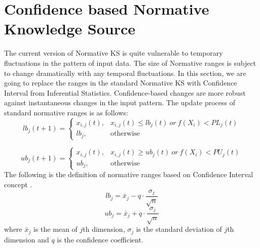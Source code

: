 \section{Confidence based Normative Knowledge Source}
The current version of Normative KS is quite vulnerable to temporary fluctuations in the pattern of input data. The size of Normative ranges is subject to change dramatically with any temporal fluctuations. In this section, we are going to replace the ranges in the standard Normative KS with Confidence Interval from Inferential Statistics. Confidence-based changes are more robust against instantaneous changes in the input pattern. The update process of standard normative ranges is as follows:
\begin{equation}
lb_{j}(t+1) = \begin{cases} x_{i,j}(t), & x_{i,j}(t)\leq lb_{j}(t)\:or\:f(X_{i})<PL_{j}(t)  \\ lb_{j}, & \mbox{otherwise} \end{cases}
\end{equation}

\begin{equation}
ub_{j}(t+1) = \begin{cases} x_{i,j}(t), & x_{i,j}(t)\ge ub_{j}(t)\:or\:f(X_{i})<PU_{j}(t)  \\ ub_{j}, & \mbox{otherwise} \end{cases} 
\end{equation}%
The following is the definition of normative ranges based on Confidence Interval concept \cite{proakis1985probability}.
\begin{equation}
lb_{j}=\bar{x}_{j}-q\cdot\dfrac{\sigma_{j}}{\sqrt{n}}
\end{equation}
\begin{equation}
ub_{j}=\bar{x}_{j}+q\cdot\dfrac{\sigma_{j}}{\sqrt{n}}
\end{equation}
where 
$\bar{x}_{j}$ is the mean of $j$th dimension, $\sigma_{j}$ is the standard deviation of $j$th dimension and $q$ is the confidence coefficient.





